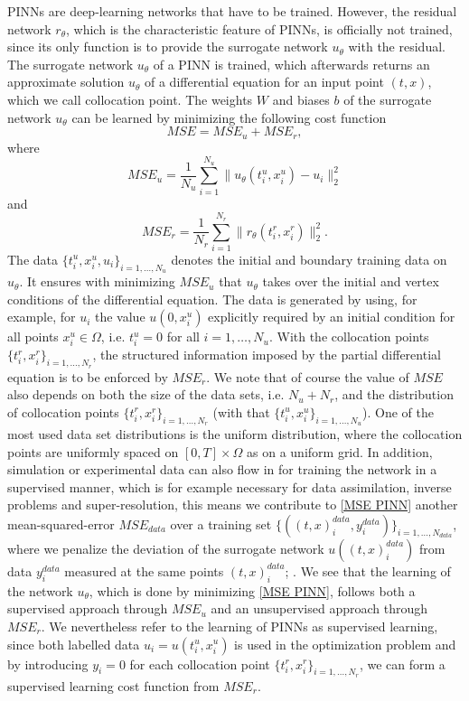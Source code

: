 PINNs are deep-learning networks that have to be trained. However, the residual network $r_\theta$, which is the characteristic feature of PINNs, is officially not trained, since its only function is to provide the surrogate network $u_\theta$ with the residual. The surrogate network $u_\theta$ of a PINN is trained, which afterwards returns an approximate solution $u_\theta$ of a differential equation for an input point $(t,x)$, which we call collocation point. The weights $W$ and biases $b$ of the surrogate network $u_\theta$ can be learned by minimizing the following cost function
\begin{equation}
    \label{MSE PINN}
    MSE = MSE_u + MSE_r, 
\end{equation}
where
\begin{equation*}
    MSE_u = \frac{1}{N_u} \sum^{N_u}_{i = 1} \lVert u_\theta(t^{u}_i, x^{u}_i) - u_i \rVert^{2}_{2}
\end{equation*}
and
\begin{equation*}
    MSE_r = \frac{1}{N_r} \sum^{N_r}_{i = 1} \lVert r_\theta (t^{r}_i, x^{r}_i) \rVert^{2}_{2}.
\end{equation*}
The data $\{t^{u}_i, x^{u}_i, u_i \}_{i = 1, \ldots, N_u}$ denotes the initial and boundary training data on $u_\theta$. It ensures with minimizing $MSE_u$ that $u_\theta$ takes over the initial and vertex conditions of the differential equation. The data is generated by using, for example, for $u_i$ the value $u(0,x^{u}_i)$ explicitly required by an initial condition for all points $x^{u}_i \in \Omega$, i.e. $t^{u}_i = 0$ for all $i = 1, \ldots, N_u$. With the collocation points $\{t^{r}_i, x^{r}_i \}_{i = 1, \ldots, N_r}$, the structured information imposed by the partial differential equation is to be enforced by $MSE_r$. We note that of course the value of $MSE$ also depends on both the size of the data sets, i.e. $N_u + N_r$, and the distribution of collocation points $\{t^{r}_i, x^{r}_i \}_{i = 1, \ldots, N_r}$ (with that $\{t^{u}_i, x^{u}_i \}_{i = 1, \ldots, N_u}$). One of the most used data set distributions is the uniform distribution, where the collocation points are uniformly spaced on $\left[ 0, T \right] \times \Omega$ as on a uniform grid. In addition, simulation or experimental data can also flow in for training the network in a supervised manner, which is for example necessary for data assimilation, inverse problems and super-resolution, this means we contribute to \cref{MSE PINN} another mean-squared-error $MSE_{data}$ over a training set $\{((t, x)^{data}_i, y^{data}_i) \}_{i = 1, \ldots, N_{data}}$, where we penalize the deviation of the surrogate network $u((t, x)^{data}_i)$ from data $y^{data}_i$ measured at the same points $(t, x)^{data}_i$; \cite[p.~2]{Markidis:2021}. We see that the learning of the network $u_\theta$, which is done by minimizing \cref{MSE PINN}, follows both a supervised approach through $MSE_u$ and an unsupervised approach through $MSE_r$. We nevertheless refer to the learning of PINNs as supervised learning, since both labelled data $u_i = u(t^{u}_i, x^{u}_i)$ is used in the optimization problem and by introducing $y_i=0$ for each collocation point $\{t^{r}_i, x^{r}_i \}_{i = 1, \ldots, N_r}$, we can form a supervised learning cost function from $MSE_r$. \\
